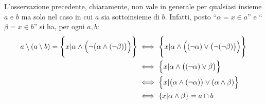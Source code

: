 L'osservazione precedente, chiaramente, non vale in generale per qualsiasi insieme $a$ e $b$ ma solo nel caso in cui $a$ sia sottoinsieme di $b$. Infatti, posto ``$\alpha= x \in a$'' e ``$\beta= x \in b$'' si ha, per ogni $a,b$:
\begin{align*}
	a \setminus (a \setminus b) = \Biggl\lbrace x | \alpha \land \Bigl(\neg \bigl(\alpha \land (\neg \beta) \bigr) \Bigr) \Biggr \rbrace &\iff  \Biggl\lbrace x | \alpha \land \Bigl((\neg \alpha) \lor \bigl(\neg(\neg \beta)\bigr)\Bigr) \Biggr \rbrace \\
	&\iff \Bigl \lbrace x | \alpha \land \bigl((\neg \alpha) \lor \beta\bigr)\Bigr \rbrace \\
	&\iff \Bigl\lbrace x |\bigl(\alpha \land (\neg \alpha)\bigr) \lor (\alpha \land \beta) \Bigr \rbrace \\
	&\iff \{x | \alpha \land \beta\} =  a \cap b
\end{align*}

